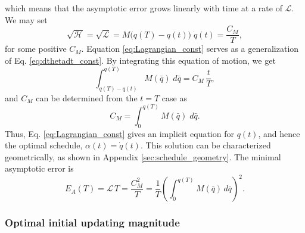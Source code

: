 \documentclass[reprint, superscriptaddress, floatfix]{revtex4-1}
\newcommand{\Err}{E}
\begin{document}
which means that the asymptotic error grows
linearly with time at a rate of $\mathcal L$.
We may set
%
\begin{equation}
  \sqrt{ \mathcal H }
  =
  \sqrt{ \mathcal L }
  =
  M\bigl( q(T) - q(t) \bigr)
  \;
  \dot q(t)
  =
  \frac{C_M}{T}
  ,
  \label{eq:Lagrangian_const}
\end{equation}
%
for some positive $C_M$.
%
Equation \eqref{eq:Lagrangian_const} serves
as a generalization of Eq. \eqref{eq:dthetadt_const}.
%
By integrating this equation of motion, we get
%
\begin{equation}
  \int_{ q(T) - q(t) }^{ q(T) }
    M(\bar q)
    \;
    d \bar q
  =
  C_M \, \frac t T
  ,
  \label{eq:q_opt}
\end{equation}
%
and $C_M$ can be determined from
the $t = T$ case as
%
\begin{equation}
  C_M =
  \int_{ 0 }^{ q(T) }
    M( \bar q )
    \;
    d \bar q
  .
  \label{eq:mint}
\end{equation}
%
Thus, Eq. \eqref{eq:Lagrangian_const}
gives an implicit equation for $q(t)$,
and hence the optimal schedule,
$\alpha(t) = \dot q(t)$.
%
This solution can be characterized geometrically,
as shown in Appendix \ref{sec:schedule_geometry}.
%
The minimal asymptotic error is
%
\begin{equation}
  \Err_A(T)
  =
  \mathcal L \, T
  =
  \frac { C_M^2 } { T }
  =
  \frac 1 T
  \left(
    \int_0^{ q(T) } M(\bar q) \, d \bar q
  \right)^{\!\!2}
  .
\label{eq:error_asym2}
\end{equation}






\subsubsection{\label{sec:optinitalpha}
  Optimal initial updating magnitude
}
\end{document}
